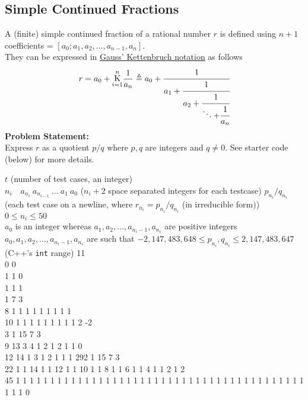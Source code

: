 \documentclass[../../Problems]{subfiles}
\begin{document}
\subsection{Simple Continued Fractions}{\label{pp:simplecontinuedfractions}}
{A (finite) simple continued fraction of a rational number $r$ is defined using $n+1$ coefficients = $[a_0; a_1, a_2,\ldots, a_{n-1}, a_n]$.
\\They can be expressed in \href{https://en.wikipedia.org/wiki/Generalized_continued_fraction#Notation}{Gauss' Kettenbruch notation} as follows
\begin{equation}
{ r=a_{0}+{\underset {i=1}{\overset {n }{\mathrm {K} }}}{\frac {1}{a_{n}}}\triangleq a_{0}+{\cfrac {1}{a_{1}+{\cfrac {1}{a_{2}+{\cfrac {1}{\ddots{+{\cfrac{1}{a_n} }}}}}}}} }
\end{equation}
\textbf{Problem Statement:}\\
Express $r$ as a quotient $p/q$ where $p,q$ are integers and $q\neq0$. See starter code (below) for more details.
\begin{testcases}
	{$t$ \hfill(number of test cases, an integer)\\%
	$n_i\quad a_{n_i}\ a_{n_{i-1}}\ \ldots\ a_1\ a_0$ \hfill($n_i+2$ space separated integers for each testcase)}
	{$p_{n_i}/q_{n_i}$ \hfill(each test case on a newline, where $r_{n_i} = p_{n_i}/q_{n_i}$ (in irreducible form))
	}
	{$0 \leq n_i \leq 50$\\
	$a_{0}$ is an integer whereas $a_1, a_2, \ldots, a_{n_i -1}, a_{n_i}$ are positive integers\\
	$a_0, a_1, a_2, \ldots, a_{n_i -1}, a_{n_i}$ are such that $-2,147,483,648\leq p_{n_i},q_{n_i}\leq2,147,483,647$\hfill(C++'s \texttt{int} range)%
	}
	{11\\0 0\\1 1 0\\1 1 1\\1 7 3\\8 1 1 1 1 1 1 1 1 1\\10 1 1 1 1 1 1 1 1 1 2 -2\\3 1 15 7 3\\9 13 3 4 1 2 1 2 1 1 0\\12 14 1 3 1 2 1 1 1 292 1 15 7 3\\22 1 1 14 1 1 12 1 1 10 1 1 8 1 1 6 1 1 4 1 1 2 1 2\\45 1 1 1 1 1 1 1 1 1 1 1 1 1 1 1 1 1 1 1 1 1 1 1 1 1 1 1 1 1 1 1 1 1 1 1 1 1 1 1 1 1 1 1 1 1 0}

\end{testcases}}
\end{document}
